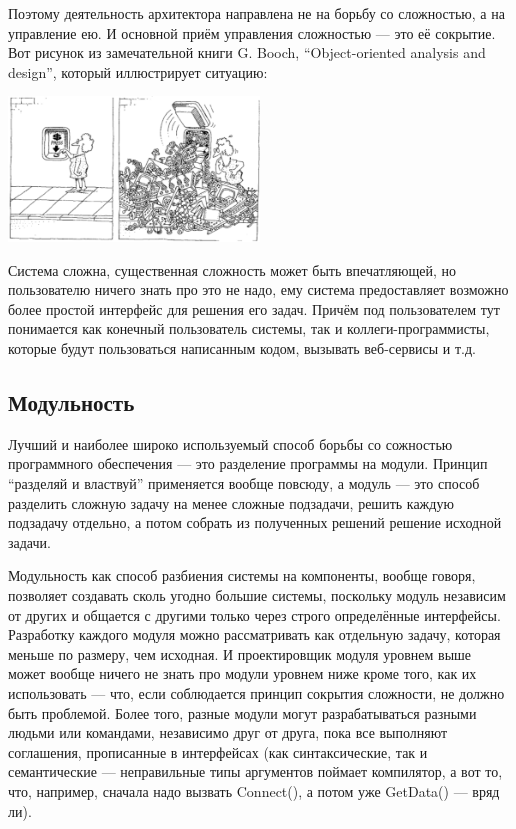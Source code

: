 \documentclass[a5paper]{article}
\begin{document}
Поэтому деятельность архитектора направлена не на борьбу со сложностью, а на управление ею. И основной приём управления сложностью --- это её сокрытие. Вот рисунок из замечательной книги G. Booch, ``Object-oriented analysis and design'', который иллюстрирует ситуацию:

\begin{center}
	\includegraphics[width=0.5\textwidth]{complexityHiding.png}
\end{center}

Система сложна, существенная сложность может быть впечатляющей, но пользователю ничего знать про это не надо, ему система предоставляет возможно более простой интерфейс для решения его задач. Причём под пользователем тут понимается как конечный пользователь системы, так и коллеги-программисты, которые будут пользоваться написанным кодом, вызывать веб-сервисы и т.д.


\subsection{Модульность}

Лучший и наиболее широко используемый способ борьбы со сожностью программного обеспечения --- это разделение программы на модули. Принцип ``разделяй и властвуй'' применяется вообще повсюду, а модуль --- это способ разделить сложную задачу на менее сложные подзадачи, решить каждую подзадачу отдельно, а потом собрать из полученных решений решение исходной задачи.

Модульность как способ разбиения системы на компоненты, вообще говоря, позволяет создавать сколь угодно большие системы, поскольку модуль независим от других и общается с другими только через строго определённые интерфейсы. Разработку каждого модуля можно рассматривать как отдельную задачу, которая меньше по размеру, чем исходная. И проектировщик модуля уровнем выше может вообще ничего не знать про модули уровнем ниже кроме того, как их использовать --- что, если соблюдается принцип сокрытия сложности, не должно быть проблемой. Более того, разные модули могут разрабатываться разными людьми или командами, независимо друг от друга, пока все выполняют соглашения, прописанные в интерфейсах (как синтаксические, так и семантические --- неправильные типы аргументов поймает компилятор, а вот то, что, например, сначала надо вызвать Connect(), а потом уже GetData() --- вряд ли).
\end{document}
